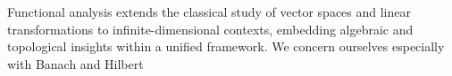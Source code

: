 Functional analysis extends the classical study of vector spaces and linear transformations to infinite-dimensional contexts,
embedding algebraic and topological insights within a 
unified framework. We concern ourselves especially with Banach and Hilbert 